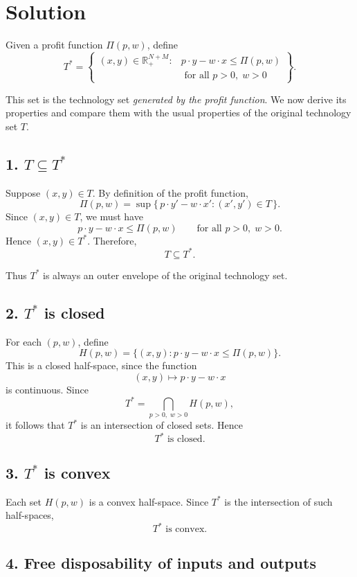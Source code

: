 \section*{Solution}

Given a profit function \(\Pi(p,w)\), define
\[
T^*
=
\left\{
\begin{aligned}
(x,y)\in \mathbb{R}_+^{N+M}
:
&p\cdot y-w\cdot x\le \Pi(p,w)\\
&\text{ for all } p>0,\; w>0
\end{aligned}
\right\}.
\]

This set is the technology set \emph{generated by the profit function}.  
We now derive its properties and compare them with the usual properties of the original technology set \(T\).

\subsection*{1. \(T \subseteq T^*\)}

Suppose \((x,y)\in T\). By definition of the profit function,
\[
\Pi(p,w)=\sup\{\,p\cdot y'-w\cdot x' : (x',y')\in T\,\}.
\]
Since \((x,y)\in T\), we must have
\[
p\cdot y-w\cdot x\le \Pi(p,w)
\qquad \text{for all } p>0,\; w>0.
\]
Hence \((x,y)\in T^*\). Therefore,
\[
\boxed{T\subseteq T^*.}
\]

Thus \(T^*\) is always an outer envelope of the original technology set.

\subsection*{2. \(T^*\) is closed}

For each \((p,w)\), define
\[
H(p,w)=\{(x,y): p\cdot y-w\cdot x\le \Pi(p,w)\}.
\]
This is a closed half-space, since the function
\[
(x,y)\mapsto p\cdot y-w\cdot x
\]
is continuous. Since
\[
T^*=\bigcap_{p>0,\;w>0} H(p,w),
\]
it follows that \(T^*\) is an intersection of closed sets. Hence
\[
\boxed{T^* \text{ is closed}.}
\]

\subsection*{3. \(T^*\) is convex}

Each set \(H(p,w)\) is a convex half-space. Since \(T^*\) is the intersection of such half-spaces,
\[
\boxed{T^* \text{ is convex}.}
\]

\subsection*{4. Free disposability of inputs and outputs}

